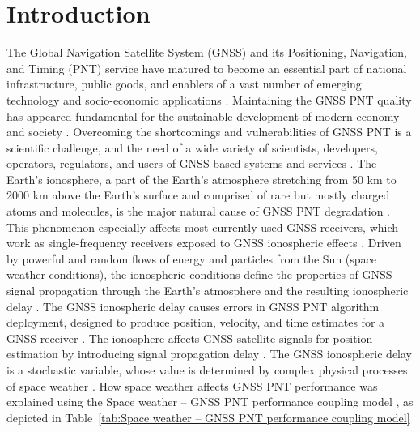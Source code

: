 \documentclass[sn-mathphys-num]{sn-jnl}%
\begin{document}



\maketitle

\section{Introduction}

The Global Navigation Satellite System (GNSS) and its Positioning, Navigation, and Timing (PNT) service have matured to become an essential part of national infrastructure, public goods, and enablers of a vast number of emerging technology and socio-economic applications \cite{filjar2022application}. Maintaining the GNSS PNT quality has appeared fundamental for the sustainable development of modern economy and society \cite{filjar2022application}. Overcoming the shortcomings and vulnerabilities of GNSS PNT is a scientific challenge, and the need of a wide variety of scientists, developers, operators, regulators, and users of GNSS-based systems and services \cite{filjar2024ambient, filjar2022application}. The Earth’s ionosphere, a part of the Earth’s atmosphere stretching from 50 km to 2000 km above the Earth’s surface and comprised of rare but mostly charged atoms and molecules, is the major natural cause of GNSS PNT degradation \cite{davies1990ionospheric, filic2018modelling}. This phenomenon especially affects most currently used GNSS receivers, which work as single-frequency receivers exposed to GNSS ionospheric effects \cite{spilker1996global, filjar2022application}. Driven by powerful and random flows of energy and particles from the Sun (space weather conditions), the ionospheric conditions define the properties of GNSS signal propagation through the Earth’s atmosphere and the resulting ionospheric delay \cite{davies1990ionospheric, oxley2017uncertainties, filic2018modelling}. The GNSS ionospheric delay causes errors in GNSS PNT algorithm deployment, designed to produce position, velocity, and time estimates for a GNSS receiver \cite{spilker1996global, filic2018modelling}. The ionosphere affects GNSS satellite signals for position estimation by introducing signal propagation delay \cite{spilker1996global, filic2018modelling}. The GNSS ionospheric delay is a stochastic variable, whose value is determined by complex physical processes of space weather \cite{filic2018modelling, filjar2022application}. How space weather affects GNSS PNT performance was explained using the Space weather – GNSS PNT performance coupling model \cite{filic2018modelling}, as depicted in Table~\ref{tab:Space weather – GNSS PNT performance coupling model}
\end{document}
